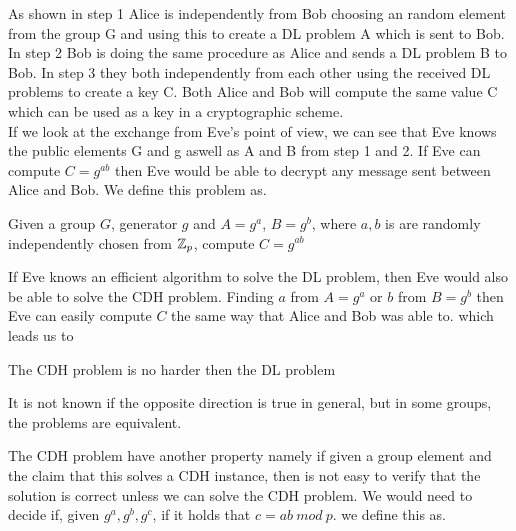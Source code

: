 \noindent
As shown in step 1 Alice is independently from Bob choosing an random element from the group G and using this to create a DL problem A which is sent to Bob. In step 2 Bob is doing the same procedure as Alice and sends a DL problem B to Bob. In step 3 they both independently from each other using the received DL problems to create a key C. Both Alice and Bob will compute the same value C which can be used as a key in a cryptographic scheme. \\

\noindent
If we look at the exchange from Eve's point of view, we can see that Eve knows the public elements G and g aswell as A and B from step 1 and 2. If Eve can compute $C = g^{ab}$ then Eve would be able to decrypt any message sent between Alice and Bob. We define this problem as. \\

\begin{defi}
Given a group $G$, generator $g$ and $A = g^a$, $B = g^b$, where $a,b$ is are randomly independently chosen from $\mathbb{Z}_p$, compute $C=g^{ab}$ 
\end{defi}

\noindent
If Eve knows an efficient algorithm to solve the DL problem, then Eve would also be able to solve the CDH problem. Finding $a$ from $A = g^a$ or $b$ from $B = g^b$ then Eve can easily compute $C$ the same way that Alice and Bob was able to. which leads us to  

\begin{lemma}
The CDH problem is no harder then the DL problem
\end{lemma}

\noindent
It is not known if the opposite direction is true in general, but in some groups, the problems are equivalent.      

 The CDH problem have another property namely if given a group element and the claim that this solves a CDH instance, then is not easy to verify that the solution is correct unless we can solve the CDH problem. 
\noindent
We would need to decide if, given $g^a, g^b, g^c$, if it holds that $c = ab \ mod \ p$. we define this as. \\

\iffalse
    \begin{defi}[Decisional Diffie-Hellman (DDH) problem]
    \begin{math}g\in\Z_p, \ g\neq1 \end{math}\\ 
    Given \begin{math}(g,g^a,g^b,g^c)\end{math} decide if  \begin{math}(a*b=c)\end{math} is hard problem.\\
    Definition: Need a reference??
    \end{defi}
\fi 

